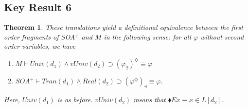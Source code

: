 \documentclass{article}
\newcommand\D{\blacklozenge}
\newtheorem{theorem}{Theorem}
\begin{document}
\subsection{Key Result 6}
\begin{theorem}
    These translations yield a definitional equivalence 
    between the first order fragments of SOA$^+$ and $M$ in the following sense: for all 
    $\varphi$ without second order variables, we have
    \begin{enumerate}
        \item $M \vdash Univ(d_1) \wedge vUniv(d_2) \supset (\varphi_\exists)^\Diamond \equiv \varphi$
        \item $SOA^+ \vdash Tran(d_1) \wedge Real(d_2) \supset (\varphi^\Diamond)_\exists \equiv \varphi.$
    \end{enumerate}
    Here, $Univ(d_1)$ is as before. $vUniv(d_2)$ means that $\D Ex \equiv x \in L[d_2]$.
    \end{theorem}
\end{document}
